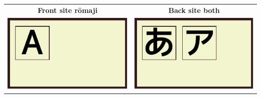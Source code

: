 \begin{center}
\begin{tabular}{cc}
\textbf{Front site rōmaji}&\textbf{Back site both}\\
\includegraphics[scale=1.5]{../share/i/fcar.pdf}%
&
\includegraphics[scale=1.5]{../share/i/fcahk.pdf}%
\\
\end{tabular}
\end{center}
